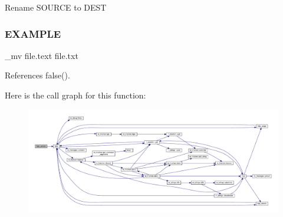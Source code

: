 Rename S\+O\+U\+R\+CE to D\+E\+ST

\subsubsection*{E\+X\+A\+M\+P\+LE}

\begin{DoxyVerb}  _mv file.text file.txt \end{DoxyVerb}
 

References false().

Here is the call graph for this function\+:
\nopagebreak
\begin{figure}[H]
\begin{center}
\leavevmode
\includegraphics[width=350pt]{__mv_8f90_a39c21619b08a3c22f19e2306efd7f766_cgraph}
\end{center}
\end{figure}

